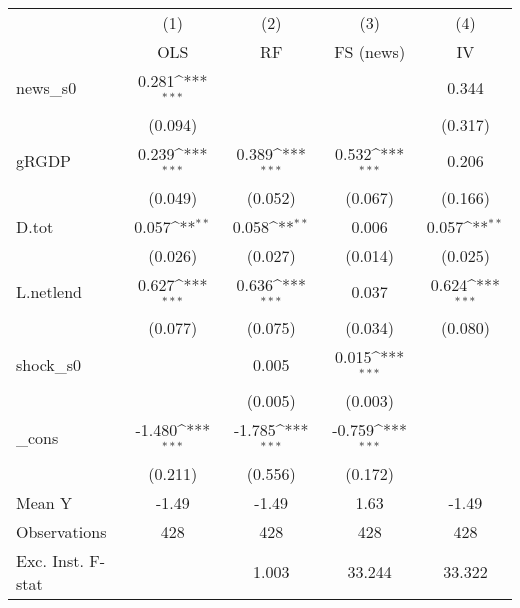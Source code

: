{
\def\sym#1{\ifmmode^{#1}\else\(^{#1}\)\fi}
\begin{tabular}{l*{4}{c}}
\toprule
            &\multicolumn{1}{c}{(1)}&\multicolumn{1}{c}{(2)}&\multicolumn{1}{c}{(3)}&\multicolumn{1}{c}{(4)}\\
            &\multicolumn{1}{c}{OLS}&\multicolumn{1}{c}{RF}&\multicolumn{1}{c}{FS (news)}&\multicolumn{1}{c}{IV}\\
\midrule
news\_s0     &       0.281\sym{***}&                     &                     &       0.344         \\
            &     (0.094)         &                     &                     &     (0.317)         \\
\addlinespace
gRGDP       &       0.239\sym{***}&       0.389\sym{***}&       0.532\sym{***}&       0.206         \\
            &     (0.049)         &     (0.052)         &     (0.067)         &     (0.166)         \\
\addlinespace
D.tot       &       0.057\sym{**} &       0.058\sym{**} &       0.006         &       0.057\sym{**} \\
            &     (0.026)         &     (0.027)         &     (0.014)         &     (0.025)         \\
\addlinespace
L.netlend   &       0.627\sym{***}&       0.636\sym{***}&       0.037         &       0.624\sym{***}\\
            &     (0.077)         &     (0.075)         &     (0.034)         &     (0.080)         \\
\addlinespace
shock\_s0    &                     &       0.005         &       0.015\sym{***}&                     \\
            &                     &     (0.005)         &     (0.003)         &                     \\
\addlinespace
\_cons      &      -1.480\sym{***}&      -1.785\sym{***}&      -0.759\sym{***}&                     \\
            &     (0.211)         &     (0.556)         &     (0.172)         &                     \\
\midrule
Mean Y      &       -1.49         &       -1.49         &        1.63         &       -1.49         \\
Observations&         428         &         428         &         428         &         428         \\
Exc. Inst. F-stat&                     &       1.003         &      33.244         &      33.322         \\
\bottomrule
\end{tabular}
}
